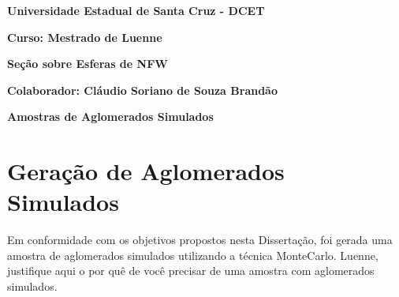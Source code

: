 \documentclass[a4paper]{report}
\begin{document}


{}
\large{\bf{Universidade Estadual de Santa Cruz - DCET}} \par \par \par
\large{\bf{Curso: Mestrado de Luenne}} \par \par \par
\large{\bf{Se\c c\~ao sobre Esferas de NFW}} \par \par
\large{\bf{Colaborador: Cl\'audio Soriano de Souza Brand\~ao}}


\large{\bf Amostras de Aglomerados Simulados}

\chapter{Gera\c c\~ao de Aglomerados Simulados}

Em conformidade com os objetivos propostos nesta Disserta\c c\~ao, foi gerada uma amostra de aglomerados simulados utilizando a t\'ecnica MonteCarlo. Luenne, justifique aqui o por qu\^e de voc\^e precisar de uma amostra com aglomerados simulados.
\end{document}
